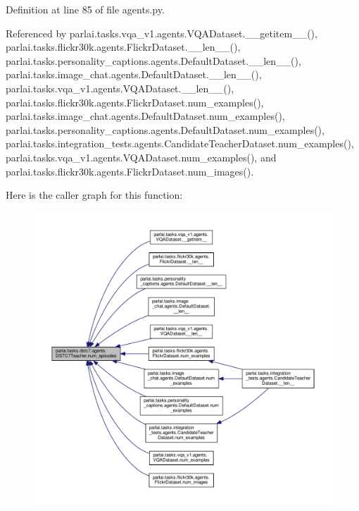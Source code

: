 Definition at line 85 of file agents.\+py.



Referenced by parlai.\+tasks.\+vqa\+\_\+v1.\+agents.\+V\+Q\+A\+Dataset.\+\_\+\+\_\+getitem\+\_\+\+\_\+(), parlai.\+tasks.\+flickr30k.\+agents.\+Flickr\+Dataset.\+\_\+\+\_\+len\+\_\+\+\_\+(), parlai.\+tasks.\+personality\+\_\+captions.\+agents.\+Default\+Dataset.\+\_\+\+\_\+len\+\_\+\+\_\+(), parlai.\+tasks.\+image\+\_\+chat.\+agents.\+Default\+Dataset.\+\_\+\+\_\+len\+\_\+\+\_\+(), parlai.\+tasks.\+vqa\+\_\+v1.\+agents.\+V\+Q\+A\+Dataset.\+\_\+\+\_\+len\+\_\+\+\_\+(), parlai.\+tasks.\+flickr30k.\+agents.\+Flickr\+Dataset.\+num\+\_\+examples(), parlai.\+tasks.\+image\+\_\+chat.\+agents.\+Default\+Dataset.\+num\+\_\+examples(), parlai.\+tasks.\+personality\+\_\+captions.\+agents.\+Default\+Dataset.\+num\+\_\+examples(), parlai.\+tasks.\+integration\+\_\+tests.\+agents.\+Candidate\+Teacher\+Dataset.\+num\+\_\+examples(), parlai.\+tasks.\+vqa\+\_\+v1.\+agents.\+V\+Q\+A\+Dataset.\+num\+\_\+examples(), and parlai.\+tasks.\+flickr30k.\+agents.\+Flickr\+Dataset.\+num\+\_\+images().

Here is the caller graph for this function\+:
\nopagebreak
\begin{figure}[H]
\begin{center}
\leavevmode
\includegraphics[width=350pt]{classparlai_1_1tasks_1_1dstc7_1_1agents_1_1DSTC7Teacher_a259540f4c5e9d81c2295a2a45f3f87dd_icgraph}
\end{center}
\end{figure}
\mbox{\label{classparlai_1_1tasks_1_1dstc7_1_1agents_1_1DSTC7Teacher_aeaff98c183e9c50d97f84c9c3d387aac}} 
